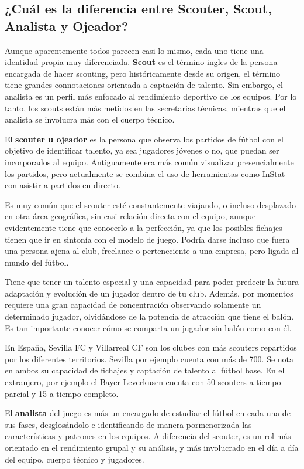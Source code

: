 \subsection{¿Cuál es la diferencia entre Scouter, Scout, Analista y Ojeador?}
Aunque aparentemente todos parecen casi lo mismo, cada uno tiene una 
identidad propia muy diferenciada. \textbf{Scout} es el término ingles de la 
persona encargada de hacer scouting, pero históricamente desde su 
origen, el término tiene grandes connotaciones orientada a captación 
de talento. Sin embargo, el analista es un perfil más enfocado al 
rendimiento deportivo de los equipos. Por lo tanto, los scouts están 
más metidos en las secretarias técnicas, mientras que el analista 
se involucra más con el cuerpo técnico.

El \textbf{scouter u ojeador} es la persona que observa los partidos de 
fútbol con el objetivo de identificar talento, ya sea jugadores 
jóvenes o no, que puedan ser incorporados al equipo. Antiguamente 
era más común visualizar presencialmente los partidos, pero 
actualmente se combina el uso de herramientas como InStat 
con asistir a partidos en directo.

Es muy común que el scouter esté constantemente viajando, o incluso 
desplazado en otra área geográfica, sin casi relación directa 
con el equipo, aunque evidentemente tiene que conocerlo a la 
perfección, ya que los posibles fichajes tienen que ir en 
sintonía con el modelo de juego. Podría darse incluso que fuera 
una persona ajena al club, freelance o perteneciente a una empresa, 
pero ligada al mundo del fútbol.

Tiene que tener un talento especial y una capacidad para poder 
predecir la futura adaptación y evolución de un jugador dentro 
de tu club. Además, por momentos requiere una gran capacidad de 
concentración observando solamente un determinado jugador, 
olvidándose de la potencia de atracción que tiene el balón. 
Es tan importante conocer cómo se comparta un jugador sin 
balón como con él.

En España, Sevilla FC y  Villarreal CF son los clubes con más 
scouters repartidos por los diferentes territorios. Sevilla por ejemplo
cuenta con más de 700. Se nota en ambos su capacidad de fichajes 
y captación de talento al fútbol base. En el extranjero, por 
ejemplo el Bayer Leverkusen cuenta con 50 scouters a tiempo parcial 
y 15 a tiempo completo.

El \textbf{analista} del juego es más un encargado de estudiar el 
fútbol en cada una de sus fases, desglosándolo e identificando 
de manera pormenorizada las características y patrones en los 
equipos. A diferencia del scouter, es un rol más orientado 
en el rendimiento grupal y su análisis, y más involucrado 
en el día a día del equipo, cuerpo técnico y jugadores.

